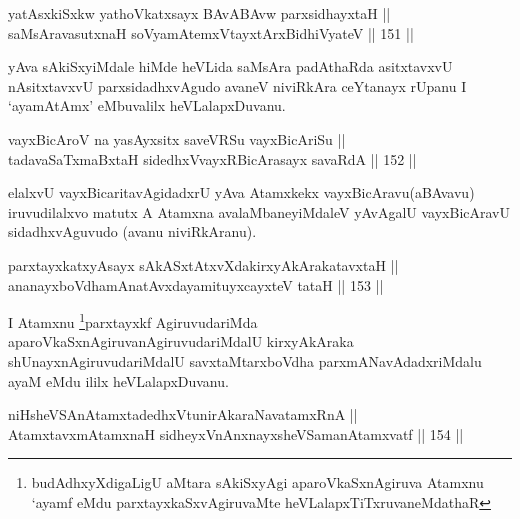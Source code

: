 
\begin{shl}
yatAsxkiSxkw yathoVkatxsayx BAvABAvw parxsidhayxtaH || \\
saMsAravasutxnaH soV\s yamAtemxVtayxtArxBidhiVyateV \hfill || 151 ||  
\end{shl}

\begin{artha}
yAva sAkiSxyiMdale hiMde heVLida saMsAra padAthaRda asitxtavxvU
nAsitxtavxvU parxsidadhxvAgudo avaneV niviRkAra ceYtanayx rUpanu I
`ayamAtAmx' eMbuvalilx heVLalapxDuvanu.
\end{artha}


\begin{shl}
vayxBicAroV na yasAyxsitx saveVRSu vayxBicAriSu || \\
tadavaSaTxmaBxtaH sidedhxVvayxRBicArasayx savaRdA \hfill || 152 || 
\end{shl}

\begin{artha}
elalxvU vayxBicaritavAgidadxrU yAva Atamxkekx vayxBicAravu\break (aBAvavu) iruvudilalxvo matutx A Atamxna avalaMbaneyiMdaleV yAvAgalU vayxBicAravU sidadhxvAguvudo (avanu niviRkAranu).
\end{artha}


\begin{shl}
parxtayxkatxyA\s sayx sAkASxtAtxvXdakirxyAkArakatavxtaH ||  \\
ananayxboVdhamAnatAvxdayamituyxcayxteV tataH \hfill || 153 ||  
\end{shl}

\begin{artha}
I Atamxnu \footnote{budAdhxyXdigaLigU aMtara sAkiSxyAgi aparoVkaSxnAgiruva Atamxnu `ayamf eMdu parxtayxkaSxvAgiruvaMte heVLalapxTiTxruvaneMdathaR}parxtayxkf AgiruvudariMda aparoVkaSxnAgiruvanAgiruvudariMdalU kirxyAkAraka shUnayxnAgiruvudariMdalU savxtaMtarx\break boVdha parxmANavAdadxriMdalu ayaM eMdu ililx heVLalapxDuvanu.
\end{artha}


\begin{shl}
niHsheVSAnAtamxtadedhxVtunirAkaraNavatamxRnA || \\
AtamxtavxmAtamxnaH sidheyxVnAnxnayxsheVSamanAtamxvatf \hfill || 154 ||  
\end{shl}

